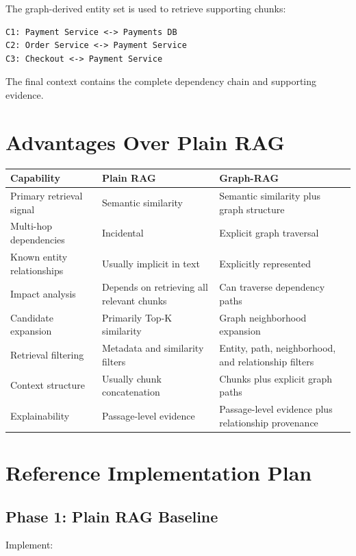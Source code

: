 \documentclass[11pt,a4paper]{article}
\begin{document}
The graph-derived entity set is used to retrieve supporting chunks:

\begin{lstlisting}
C1: Payment Service <-> Payments DB
C2: Order Service <-> Payment Service
C3: Checkout <-> Payment Service
\end{lstlisting}

The final context contains the complete dependency chain and supporting evidence.

\section{Advantages Over Plain RAG}

\begin{longtable}{p{3.2cm}p{5.5cm}p{5.5cm}}
\toprule
Capability & Plain RAG & Graph-RAG \\
\midrule
\endhead
Primary retrieval signal & Semantic similarity & Semantic similarity plus graph structure \\
Multi-hop dependencies & Incidental & Explicit graph traversal \\
Known entity relationships & Usually implicit in text & Explicitly represented \\
Impact analysis & Depends on retrieving all relevant chunks & Can traverse dependency paths \\
Candidate expansion & Primarily Top-K similarity & Graph neighborhood expansion \\
Retrieval filtering & Metadata and similarity filters & Entity, path, neighborhood, and relationship filters \\
Context structure & Usually chunk concatenation & Chunks plus explicit graph paths \\
Explainability & Passage-level evidence & Passage-level evidence plus relationship provenance \\
\bottomrule
\end{longtable}

\section{Reference Implementation Plan}

\subsection{Phase 1: Plain RAG Baseline}

Implement:
\end{document}
